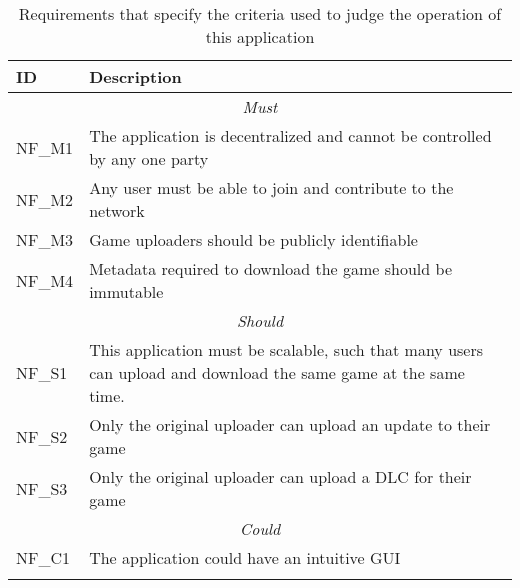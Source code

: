 \begin{longtable}{ p{} p{} }
  \toprule
  \textbf{ID} & \textbf{Description}
  \\\midrule\midrule
  \multicolumn{2}{c}{\cellcolor{red!70}\textit{Must}}\\\midrule
  NF\_M1 & The application is decentralized and cannot be controlled by any one party\\
  NF\_M2 & Any user must be able to join and contribute to the network\\
  NF\_M3 & Game uploaders should be publicly identifiable\\
  NF\_M4 & Metadata required to download the game should be immutable\\
  \midrule\multicolumn{2}{c}{\cellcolor{orange!70}\textit{Should}}\\\midrule
  NF\_S1 & This application must be scalable, such that many users can upload and download the same game at the same time.\\
  NF\_S2 & Only the original uploader can upload an update to their game\\
  NF\_S3 & Only the original uploader can upload a DLC for their game\\
  \midrule\multicolumn{2}{c}{\cellcolor{green}\textit{Could}}\\\midrule
  NF\_C1 & The application could have an intuitive GUI\\
  \midrule
  \bottomrule
  \caption{Requirements that specify the criteria used to judge the operation of this application}
  \label{tab:non-functional-requirements}
\end{longtable}